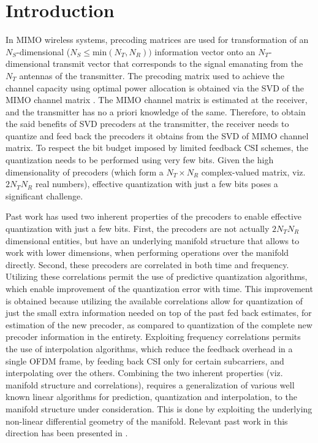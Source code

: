 \documentclass[conference]{IEEEtran}
\begin{document}
\section{Introduction}
\label{intro}
In MIMO wireless systems, precoding matrices are used for transformation of an $N_S$-dimensional ($N_S \leq \text{min}(N_T,N_R))$ information vector onto an $N_T$-dimensional transmit vector that corresponds to the signal emanating from the $N_T$ antennas of the transmitter.
The precoding matrix used to achieve the channel capacity using optimal power allocation is obtained via the SVD of the MIMO channel matrix \cite{love2008overview}.
The MIMO channel matrix is estimated at the receiver, and the transmitter has no a priori knowledge of the same.
Therefore, to obtain the said benefits of SVD precoders at the transmitter, the receiver needs to quantize and feed back the precoders it obtains from the SVD of MIMO channel matrix.
To respect the bit budget imposed by limited feedback CSI schemes, the quantization needs to be performed using very few bits.
Given the high dimensionality of precoders (which form a $N_T \times N_R$ complex-valued matrix, viz. $2N_TN_R$ real numbers), effective quantization with just a few bits poses a significant challenge.

Past work has used two inherent properties of the precoders to enable effective quantization with just a few bits.
First, the precoders are not actually $2N_TN_R$ dimensional entities, but have an underlying manifold structure that allows to work with lower dimensions, when performing operations over the manifold directly.
Second, these precoders are correlated in both time and frequency.
Utilizing these correlations permit the use of predictive quantization algorithms, which enable improvement of the quantization error with time.
This improvement is obtained because utilizing the available correlations allow for quantization of just the small extra information needed on top of the past fed back estimates, for estimation of the new precoder, as compared to quantization of the complete new precoder information in the entirety.
Exploiting frequency correlations permits the use of interpolation algorithms, which reduce the feedback overhead in a single OFDM frame, by feeding back CSI only for certain subcarriers, and interpolating over the others.
Combining the two inherent properties (viz. manifold structure and correlations), requires a generalization of various well known linear algorithms for prediction, quantization and interpolation, to the manifold structure under consideration. This is done by exploiting the underlying non-linear differential geometry of the manifold. Relevant past work in this direction has been presented in \cite{Gupt1905:Predictive,6891198,6545375,5671092,Li2016,khaled2005quantized,krishnamachari2013geometry}.
\end{document}
